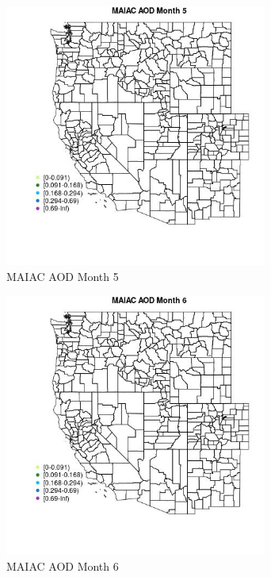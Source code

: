 \begin{figure} 
\centering  
\includegraphics[width=0.77\textwidth]{Code_Outputs/Report_ML_input_PM25_Step4_part_e_de_duplicated_aveswNAs_MapObsMo5MAIAC_AOD.jpg} 
\caption{\label{fig:Report_ML_input_PM25_Step4_part_e_de_duplicated_aveswNAsMapObsMo5MAIAC_AOD}MAIAC AOD Month 5} 
\end{figure} 
 

\begin{figure} 
\centering  
\includegraphics[width=0.77\textwidth]{Code_Outputs/Report_ML_input_PM25_Step4_part_e_de_duplicated_aveswNAs_MapObsMo6MAIAC_AOD.jpg} 
\caption{\label{fig:Report_ML_input_PM25_Step4_part_e_de_duplicated_aveswNAsMapObsMo6MAIAC_AOD}MAIAC AOD Month 6} 
\end{figure} 
 

